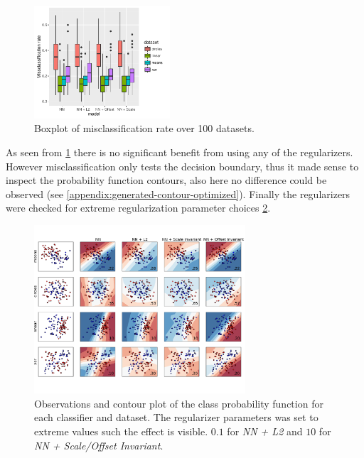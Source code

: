 \begin{figure}[h]
	\centering
	\includegraphics[width=0.45\textwidth]{plots/2d_significant}
	\caption{Boxplot of misclassification rate over 100 datasets.}
	\label{fig:2d_significant}
\end{figure}

As seen from \cref{fig:2d_significant} there is no significant benefit from using any of the regularizers. However misclassification only tests the decision boundary, thus it made sense to inspect the probability function contours, also here no difference could be observed (see \cref{appendix:generated-contour-optimized}). Finally the regularizers were checked for extreme regularization parameter choices \cref{plt:generated-contour-extream}.

\begin{figure}[ht]
	\centering
	\includegraphics[width=0.7\textwidth, trim = 0 2.2cm 0 1.5cm, clip]{plots/2d_classifier-extream}
	\caption{Observations and contour plot of the class probability function for each classifier and dataset. The regularizer parameters was set to extreme values such the effect is visible. $0.1$ for \textit{NN + L2} and $10$ for \textit{NN + Scale/Offset Invariant}.}
	\label{plt:generated-contour-extream}
\end{figure}

